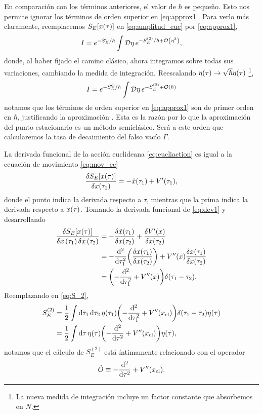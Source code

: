 En comparación con los términos anteriores, el valor de $\hbar$ es pequeño. Esto nos permite ignorar los términos de orden superior en \eqref{eq:approx1}. Para verlo más claramente, reemplacemos $S_{E}\qty[x\qty(\tau)]$ en \eqref{eq:amplitud_euc} por \eqref{eq:approx1},
\begin{equation}\label{eq:Iaprox1}
I = e^{-S_E^{\textrm{cl}}/\hbar} \int \mathcal{D}\eta \, e^{-S_E^{(2)}/\hbar + \order{\eta^3}},
\end{equation}
donde, al haber fijado el camino clásico, ahora integramos sobre todas sus variaciones, cambiando la medida de integración. Reescalando $\eta\qty(\tau) \rightarrow \sqrt{\hbar}\eta\qty(\tau)$ \footnote{La nueva medida de integración incluye un factor constante que absorbemos en $N$.},
\begin{equation}\label{eq:Iaprox2}
I = e^{-S_E^{\textrm{cl}}/\hbar} \int \mathcal{D}\eta \, e^{-S_E^{(2)} + \order{\hbar}}
\end{equation}
notamos que los términos de orden superior en \eqref{eq:approx1} son de primer orden en $\hbar$, justificando la aproximación \cite{paranjape2017theory}. Esta es la razón por lo que la aproximación del punto estacionario es un método semiclásico. Será a este orden que calcularemos la tasa de decaimiento del falso vacío $\Gamma$. 

La derivada funcional de la acción euclideana \eqref{eq:eucliaction} es igual a la ecuación de movimiento \eqref{eq:mov_ec}
\begin{equation} \label{eq:dev1}
	\fdv{S_E\qty[x\qty(\tau)]}{x\qty(\tau_1)} = -\ddot{x}\qty(\tau_1) + V'\qty(\tau_1),
\end{equation}
donde el punto indica la derivada respecto a $\tau$, mientras que la prima indica la derivada respecto a $x\qty(\tau)$. Tomando la derivada funcional de \eqref{eq:dev1} y desarrollando 
\begin{align}
\frac{\var{S_E[x\qty(\tau)]}}{{\var{x}(\tau_1)} \var{x}\qty(\tau_2)} &= -\fdv{\ddot{x}\qty(\tau_1)}{x\qty(\tau_2)} + \fdv{V'\qty(x)}{x\qty(\tau_2)} \\
&= -\dv[2]{\tau_1}\qty(\fdv{x\qty(\tau_1)}{x\qty(\tau_2)}) + V''\qty(x)\fdv{x\qty(\tau_1)}{x\qty(\tau_2)} \\
&= \qty(-\dv[2]{\tau_1} + V''\qty(x)) \delta\qty(\tau_1 - \tau_2).
\end{align}
Reemplazando en \eqref{eq:S_2},
\begin{align}
	S_E^{(2)} &= \frac{1}{2} \int \dd{\tau_1} \dd{\tau_2} \eta\qty(\tau_1) \qty(-\dv[2]{\tau_1} + V''\qty(x_{\text{cl}}))\delta\qty(\tau_1 - \tau_2) \eta\qty(\tau) \\ \label{eq:S_2_1}
	&= \frac{1}{2} \int \dd{\tau} \eta\qty(\tau) \qty(-\dv[2]{\tau} + V''\qty(x_{\text{cl}})) \eta\qty(\tau),
\end{align}
notamos que el cálculo de $S_E^{(2)}$ está íntimamente relacionado con el operador
\begin{equation} \label{eq:operador}
	\hat{O} \equiv -\dv[2]{\tau} + V''\qty(x_{\text{cl}}).
\end{equation}

